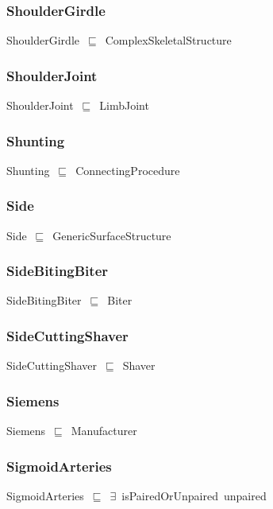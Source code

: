 \documentclass{article}
\begin{document}
\subsubsection*{ShoulderGirdle}

ShoulderGirdle~\ensuremath{\sqsubseteq}~ComplexSkeletalStructure~

\subsubsection*{ShoulderJoint}

ShoulderJoint~\ensuremath{\sqsubseteq}~LimbJoint~

\subsubsection*{Shunting}

Shunting~\ensuremath{\sqsubseteq}~ConnectingProcedure~

\subsubsection*{Side}

Side~\ensuremath{\sqsubseteq}~GenericSurfaceStructure~

\subsubsection*{SideBitingBiter}

SideBitingBiter~\ensuremath{\sqsubseteq}~Biter~

\subsubsection*{SideCuttingShaver}

SideCuttingShaver~\ensuremath{\sqsubseteq}~Shaver~

\subsubsection*{Siemens}

Siemens~\ensuremath{\sqsubseteq}~Manufacturer~

\subsubsection*{SigmoidArteries}

SigmoidArteries~\ensuremath{\sqsubseteq}~\ensuremath{\exists}~isPairedOrUnpaired~unpaired~
\end{document}
